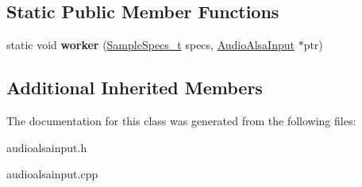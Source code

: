 \subsection*{Static Public Member Functions}
\begin{DoxyCompactItemize}
\item 
\hypertarget{classNl_1_1AudioAlsaInput_ab0101f7ca9a3c17a7528de84bc8af604}{}static void {\bfseries worker} (\hyperlink{structNl_1_1SampleSpecs__t}{Sample\+Specs\+\_\+t} specs, \hyperlink{classNl_1_1AudioAlsaInput}{Audio\+Alsa\+Input} $\ast$ptr)\label{classNl_1_1AudioAlsaInput_ab0101f7ca9a3c17a7528de84bc8af604}

\end{DoxyCompactItemize}
\subsection*{Additional Inherited Members}


The documentation for this class was generated from the following files\+:\begin{DoxyCompactItemize}
\item 
audioalsainput.\+h\item 
audioalsainput.\+cpp\end{DoxyCompactItemize}
